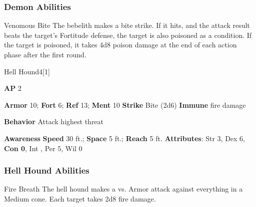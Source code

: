 \subsubsection{Demon Abilities}

\begin{ability}{Venomous Bite}
The bebelith makes a bite strike.
If it hits, and the attack result beats the target's Fortitude defense, the target is also poisoned as a condition.
If the target is poisoned, it takes 4d8 poison damage at the end of each action phase after the first round.
\end{ability}

\begin{monsection}{Hell Hound}{4}[1]
\vspace{-1em}\vspace{-1em}
\begin{spellcontent}
\begin{spelltargetinginfo}
{\textbf{AP} 2}

\pari \textbf{Armor} 10;
\textbf{Fort} 6;
\textbf{Ref} 13;
\textbf{Ment} 10
\pari \textbf{Strike} Bite  (2d6)
\pari \textbf{Immune} fire damage


\pari \textbf{Behavior} Attack highest threat
\end{spelltargetinginfo}
\end{spellcontent}

\begin{monsterfooter}
\pari \textbf{Awareness} 
\pari \textbf{Speed} 30 ft.;
\textbf{Space} 5 ft.;
\textbf{Reach} 5 ft.
\pari \textbf{Attributes}:
Str 3,
Dex 6,
\textbf{Con 0},
Int ,
Per 5,
Wil 0
\end{monsterfooter}
\end{monsection}


\subsubsection{Hell Hound Abilities}

\begin{ability}{Fire Breath}
The hell hound makes a  vs. Armor attack against everything in a Medium cone.
\hit Each target takes 2d8 fire damage.
\end{ability}

